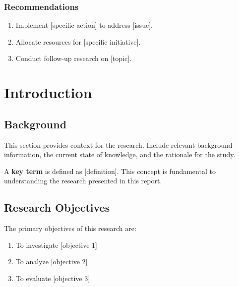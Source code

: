 \documentclass[11pt,letterpaper]{report}
\begin{document}
\subsection*{Recommendations}

\begin{recommendations}
\begin{enumerate}
    \item Implement [specific action] to address [issue].
    \item Allocate resources for [specific initiative].
    \item Conduct follow-up research on [topic].
\end{enumerate}
\end{recommendations}

\newpage
{}


\chapter{Introduction}

\section{Background}

This section provides context for the research. Include relevant background information, the current state of knowledge, and the rationale for the study.

\begin{definition}
A \textbf{key term} is defined as [definition]. This concept is fundamental to understanding the research presented in this report.
\end{definition}

\section{Research Objectives}

The primary objectives of this research are:

\begin{enumerate}
    \item To investigate [objective 1]
    \item To analyze [objective 2]
    \item To evaluate [objective 3]
\end{enumerate}
\end{document}
